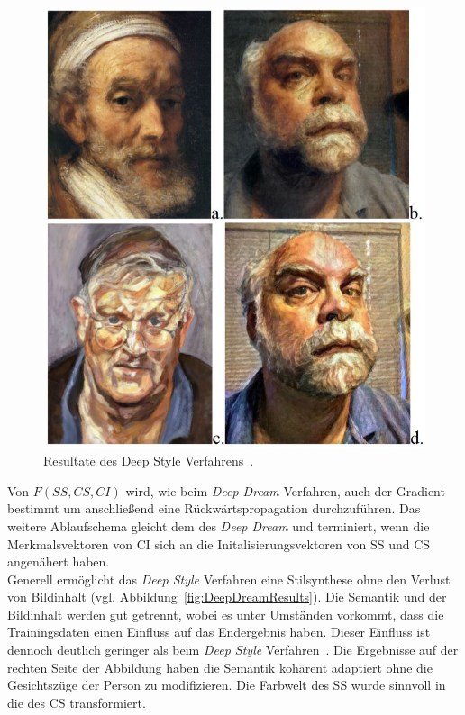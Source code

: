 \documentclass[times, 11pt,twocolumn]{article}
\begin{document}
\begin{figure}
	\flushleft
	\includegraphics[width=\columnwidth]{Bilder/DeepStyleResults.JPG}
	\caption{Resultate des Deep Style Verfahrens~\cite{McCaigDG16}.}
	\label{fig:DeepStyleResults}
\end{figure}
Von $F(SS,CS,CI)$ wird, wie beim \textit{Deep Dream} Verfahren, auch der Gradient bestimmt um anschließend eine Rückwärtspropagation durchzuführen. Das weitere Ablaufschema gleicht dem des \textit{Deep Dream} und terminiert, wenn die Merkmalsvektoren von CI sich an die Initalisierungsvektoren von SS und CS angenähert haben.\\

Generell ermöglicht das \textit{Deep Style} Verfahren eine Stilsynthese ohne den Verlust von Bildinhalt (vgl. Abbildung~\ref{fig:DeepDreamResults}). Die Semantik und der Bildinhalt werden gut getrennt, wobei es unter Umständen vorkommt, dass die Trainingsdaten einen Einfluss auf das Endergebnis haben. Dieser Einfluss ist dennoch deutlich geringer als beim \textit{Deep Style} Verfahren~\cite{McCaigDG16}. Die Ergebnisse auf der rechten Seite der Abbildung haben die Semantik kohärent adaptiert ohne die Gesichtszüge der Person zu modifizieren. Die Farbwelt des SS wurde sinnvoll in die des CS transformiert. 
\end{document}
